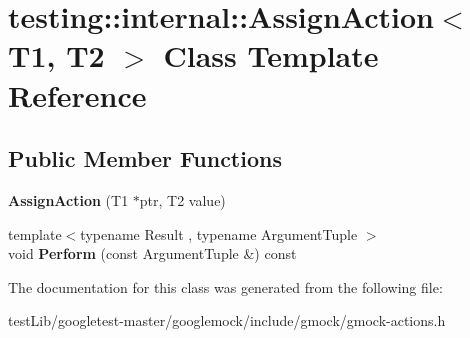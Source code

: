 \hypertarget{classtesting_1_1internal_1_1AssignAction}{}\section{testing\+:\+:internal\+:\+:Assign\+Action$<$ T1, T2 $>$ Class Template Reference}
\label{classtesting_1_1internal_1_1AssignAction}
\subsection*{Public Member Functions}
\begin{DoxyCompactItemize}
\item 
\mbox{\label{classtesting_1_1internal_1_1AssignAction_ae5a8fe8954ff3f8b26a08b57c3afdf9a}} 
{\bfseries Assign\+Action} (T1 $\ast$ptr, T2 value)
\item 
\mbox{\label{classtesting_1_1internal_1_1AssignAction_a540912bec1f4de6fc4c7de26312e4586}} 
{\footnotesize template$<$typename Result , typename Argument\+Tuple $>$ }\\void {\bfseries Perform} (const Argument\+Tuple \&) const
\end{DoxyCompactItemize}


The documentation for this class was generated from the following file\+:\begin{DoxyCompactItemize}
\item 
test\+Lib/googletest-\/master/googlemock/include/gmock/gmock-\/actions.\+h\end{DoxyCompactItemize}
